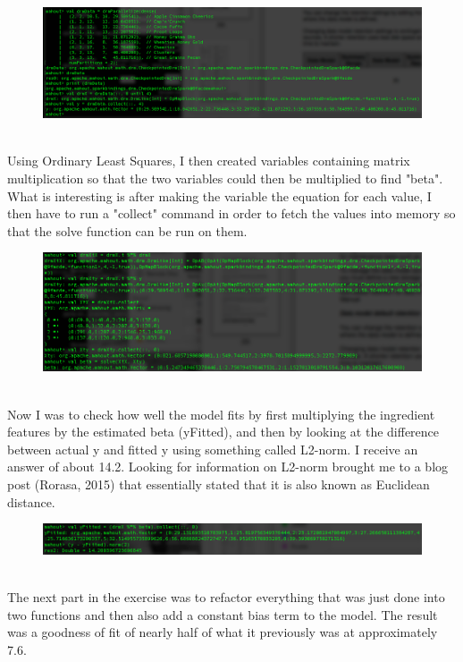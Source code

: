\documentclass[10pt]{article}
\begin{document}
\begin{figure}[!h]
\includegraphics[scale=0.37]{setup.png}
\centering
\end{figure}\\
\indent Using Ordinary Least Squares, I then created variables containing matrix multiplication so that the two variables could then be multiplied to find "beta". What is interesting is after making the variable the equation for each value, I then have to run a "collect" command in order to fetch the values into memory so that the solve function can be run on them.
\begin{figure}[!h]
\includegraphics[scale=0.37]{equation.png}
\centering
\end{figure}\\
\indent Now I was to check how well the model fits by first multiplying the ingredient features by the estimated beta (yFitted), and then by looking at the difference between actual y and fitted y using something called L2-norm. I receive an answer of about 14.2. Looking for information on L2-norm brought me to a blog post (Rorasa, 2015) that essentially stated that it is also known as Euclidean distance.
\begin{figure}[!h]
\includegraphics[scale=0.37]{fit1.png}
\centering
\end{figure}\\
\indent The next part in the exercise was to refactor everything that was just done into two functions and then also add a constant bias term to the model. The result was a goodness of fit of nearly half of what it previously was at approximately 7.6.
\end{document}
